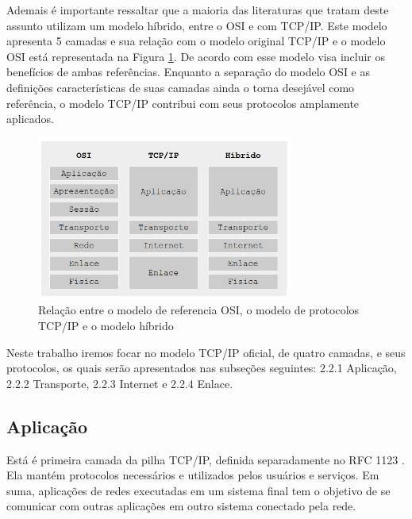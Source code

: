 Ademais é importante ressaltar que a maioria das literaturas que tratam deste assunto utilizam um modelo híbrido, entre o OSI e com TCP/IP. Este modelo apresenta 5 camadas e sua relação com o modelo original TCP/IP e o modelo OSI está representada na Figura \ref{fig:tresmodelos}. De acordo com \cite{TANENBAUM} esse modelo visa incluir os benefícios de ambas referências. Enquanto a separaç\~ao do modelo OSI e as definições caracter\'isticas de suas camadas ainda o torna desej\'avel como referência, o modelo TCP/IP contribui com seus protocolos amplamente aplicados.

\begin{figure}[H]
	\centering
    \includegraphics[width=0.75\textwidth]{04-figuras/tresmodelos.png}
    \caption{Relação entre o modelo de referencia OSI, o modelo de protocolos TCP/IP e o modelo híbrido}
    \label{fig:tresmodelos}
\end{figure} 

Neste trabalho iremos focar no modelo TCP/IP oficial, de quatro camadas, e seus protocolos, os quais serão apresentados nas subseções seguintes: 2.2.1 Aplicação, 2.2.2 Transporte, 2.2.3 Internet e 2.2.4 Enlace. 

\subsection{Aplicação}

Está é primeira camada da pilha TCP/IP, definida separadamente no RFC 1123 \cite{RFC1123}. Ela mantém protocolos necessários e utilizados pelos usuários e serviços. Em suma, aplicações de redes executadas em um sistema final tem o objetivo de se comunicar com outras aplicações em outro sistema conectado pela rede\cite{KUROSE}.

